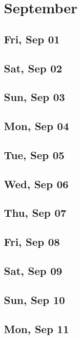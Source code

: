 \chapter{September}
	\section{Fri, Sep 01}
		
	\section{Sat, Sep 02}
		
	\section{Sun, Sep 03}
		
	\section{Mon, Sep 04}
		
	\section{Tue, Sep 05}
		
	\section{Wed, Sep 06}
		
	\section{Thu, Sep 07}
		
	\section{Fri, Sep 08}
		
	\section{Sat, Sep 09}
		
	\section{Sun, Sep 10}
		
	\section{Mon, Sep 11}
		
